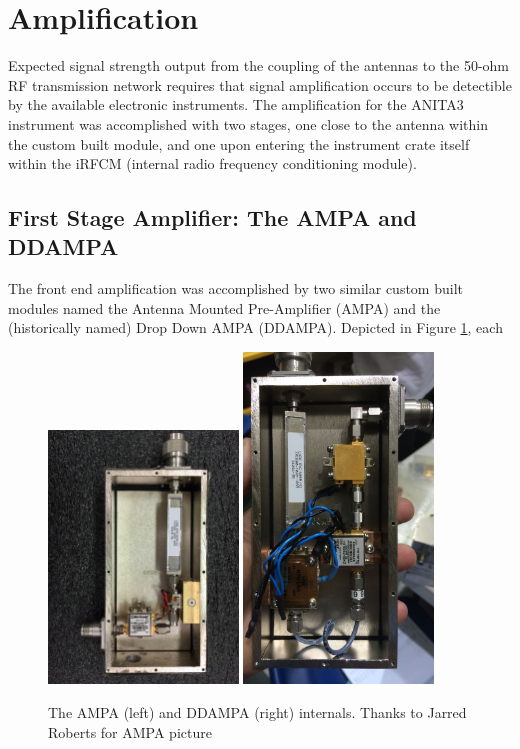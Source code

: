 \section{Amplification}
	Expected signal strength output from the coupling of the antennas to the 50-ohm RF transmission network requires that signal amplification occurs to be detectible by the available electronic instruments.  The amplification for the ANITA3 instrument was accomplished with two stages, one close to the antenna within the custom built module, and one upon entering the instrument crate itself within the iRFCM (internal radio frequency conditioning module).  
	
	\subsection{First Stage Amplifier: The AMPA and DDAMPA}
		The front end amplification was accomplished by two similar custom built modules named the Antenna Mounted Pre-Amplifier (AMPA) and the (historically named) Drop Down AMPA (DDAMPA).  Depicted in Figure \ref{fig:AMPAandDDAMPA}, each 
		
		
\begin{figure}
\centering
	\includegraphics[width=0.45\textwidth]{figures/AMPA}
	\includegraphics[width=0.45\textwidth]{figures/DDAMPA}	
	
	\caption{The AMPA (left) and DDAMPA (right) internals.  Thanks to Jarred Roberts for AMPA picture}
	\label{fig:AMPAandDDAMPA}
\end{figure}	
	
